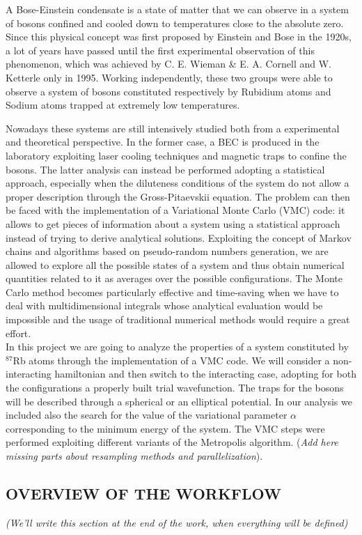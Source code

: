 A Bose-Einstein condensate is a state of matter that we can observe in a system of bosons confined and cooled down to temperatures close to the absolute zero. Since this physical concept was first proposed by Einstein and Bose \cite{einstein_original} in the 1920s, a lot of years have passed until the first experimental observation of this phenomenon, which was achieved by C. E. Wieman \& E. A. Cornell \cite{wieman} and W. Ketterle \cite{ketterle} only in 1995. Working independently, these two groups were able to observe a system of bosons constituted respectively by Rubidium atoms and Sodium atoms trapped at extremely low temperatures. 

Nowadays these systems are still intensively studied both from a experimental and theoretical perspective. In the former case, a BEC is produced in the laboratory exploiting laser cooling techniques and magnetic traps to confine the bosons. The latter analysis can instead be performed adopting a statistical approach, especially when the diluteness conditions of the system do not allow a proper description through the Gross-Pitaevskii equation. The problem can then be faced with the implementation of a Variational Monte Carlo (VMC) code: it allows to get pieces of information about a system using a statistical approach instead of trying to derive analytical solutions. Exploiting the concept of Markov chains and algorithms based on pseudo-random numbers generation, we are allowed to explore all the possible states of a system and thus obtain numerical quantities related to it as averages over the possible configurations. The Monte Carlo method becomes particularly effective and time-saving when we have to deal with multidimensional integrals whose analytical evaluation would be impossible and the usage of traditional numerical methods would require a great effort.  \\


In this project we are going to analyze the properties of a system constituted by $^{87}$Rb atoms through the implementation of a VMC code. We will consider a non-interacting hamiltonian and then switch to the interacting case, adopting for both the configurations a properly built trial wavefunction. The traps for the bosons will be described through a spherical or an elliptical potential. In our analysis we included also the search for the value of the variational parameter $\alpha$ corresponding to the minimum energy of the system. The VMC steps were performed exploiting different variants of the Metropolis algorithm. (\textit{Add here missing parts about resampling methods and parallelization}).


\subsection{OVERVIEW OF THE WORKFLOW}
\textit{(We'll write this section at the end of the work, when everything will be defined)}